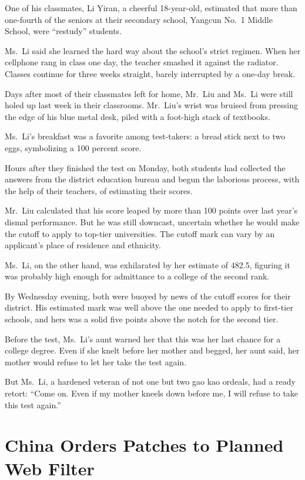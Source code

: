﻿\documentclass[12pt,a4paper,onecolumn]{article}
\begin{document}
One of his classmates, Li Yiran, a cheerful 18-year-old, estimated that more than one-fourth of the
seniors at their secondary school, Yangcun No.~1 Middle School, were ``restudy'' students.

Ms.~Li said she learned the hard way about the school's strict regimen. When her cellphone rang in
class one day, the teacher smashed it against the radiator. Classes continue for three weeks
straight, barely interrupted by a one-day break.

Days after most of their classmates left for home, Mr.~Liu and Ms.~Li were still holed up last week
in their classrooms. Mr.~Liu's wrist was bruised from pressing the edge of his blue metal desk,
piled with a foot-high stack of textbooks.

Ms.~Li's breakfast was a favorite among test-takers: a bread stick next to two eggs, symbolizing a
100 percent score.

Hours after they finished the test on Monday, both students had collected the answers from the
district education bureau and begun the laborious process, with the help of their teachers, of
estimating their scores.

Mr.~Liu calculated that his score leaped by more than 100 points over last year's dismal
performance. But he was still downcast, uncertain whether he would make the cutoff to apply to
top-tier universities. The cutoff mark can vary by an applicant's place of residence and ethnicity.

Ms.~Li, on the other hand, was exhilarated by her estimate of 482.5, figuring it was probably high
enough for admittance to a college of the second rank.

By Wednesday evening, both were buoyed by news of the cutoff scores for their district. His
estimated mark was well above the one needed to apply to first-tier schools, and hers was a solid
five points above the notch for the second tier.

Before the test, Ms.~Li's aunt warned her that this was her last chance for a college degree. Even
if she knelt before her mother and begged, her aunt said, her mother would refuse to let her take
the test again.

But Ms.~Li, a hardened veteran of not one but two gao kao ordeals, had a ready retort: ``Come on.
Even if my mother kneels down before me, I will refuse to take this test again.''

\section{China Orders Patches to Planned Web Filter}
\end{document}
